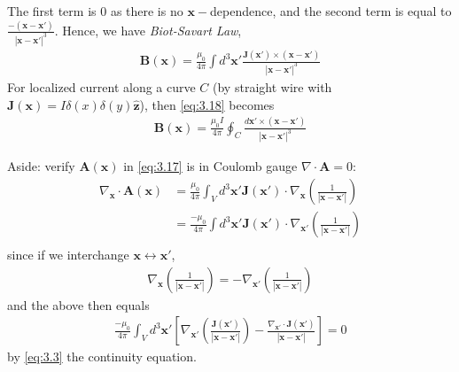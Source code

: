 \documentclass[a4paper]{article}
\begin{document}
The first term is $0$ as there is no $\mathbf{x}-$dependence, and the second term is equal to $\frac{-(\mathbf{x}-\mathbf{x}')}{|\mathbf{x}-\mathbf{x}'|^3}$. Hence, we have \emph{Biot-Savart Law},
\begin{equation*}\tag{3.18} \label{eq:3.18}
\begin{aligned}
\mathbf{B}(\mathbf{x}) = \frac{\mu_0}{4\pi} \int d^3 \mathbf{x}' \frac{\mathbf{J}(\mathbf{x}') \times (\mathbf{x}-\mathbf{x}')}{|\mathbf{x}-\mathbf{x}'|^3}
\end{aligned}
\end{equation*}
For localized current along a curve $C$ (by straight wire with $\mathbf{J}(\mathbf{x}) = I\delta(x) \delta(y) \hat{\mathbf{z}}$), then \eqref{eq:3.18} becomes
\begin{equation*}\tag{3.19} \label{eq:3.19}
\begin{aligned}
\mathbf{B}(\mathbf{x}) = \frac{\mu_0 I}{4\pi} \oint_C \frac{d\mathbf{x}' \times (\mathbf{x}-\mathbf{x}')}{|\mathbf{x}-\mathbf{x}'|^3}
\end{aligned}
\end{equation*}

Aside: verify $\mathbf{A}(\mathbf{x})$ in \eqref{eq:3.17} is in Coulomb gauge $\nabla \cdot \mathbf{A} = 0$:
\begin{equation*}
\begin{aligned}
\nabla_\mathbf{x}\cdot \mathbf{A}(\mathbf{x}) &= \frac{\mu_0}{4\pi} \int_V d^3 \mathbf{x}' \mathbf{J}(\mathbf{x}') \cdot \nabla_\mathbf{x} \left(\frac{1}{|\mathbf{x}-\mathbf{x}'|} \right)\\
&= \frac{-\mu_0}{4\pi} \int d^3 \mathbf{x}' \mathbf{J}(\mathbf{x}') \cdot \nabla_\mathbf{x'} \left(\frac{1}{|\mathbf{x}-\mathbf{x}'|}\right)\\
\end{aligned}
\end{equation*}
since if we interchange $\mathbf{x} \leftrightarrow \mathbf{x}'$, 
\begin{equation*}
\begin{aligned}
\nabla_\mathbf{x} \left(\frac{1}{|\mathbf{x}-\mathbf{x}'|}\right) = -\nabla_\mathbf{x'} \left(\frac{1}{|\mathbf{x}-\mathbf{x}'|}\right)
\end{aligned}
\end{equation*}
and the above then equals
\begin{equation*}
\begin{aligned}
\frac{-\mu_0}{4\pi} \int_V d^3 \mathbf{x}' \left[\nabla_\mathbf{x'} \left(\frac{\mathbf{J}(\mathbf{x'})}{|\mathbf{x}-\mathbf{x}'|}\right) - \frac{\nabla_\mathbf{x'} \cdot \mathbf{J}(\mathbf{x}')}{|\mathbf{x}-\mathbf{x}'|}\right] =0 
\end{aligned}
\end{equation*}
by \eqref{eq:3.3} the continuity equation.
\end{document}
